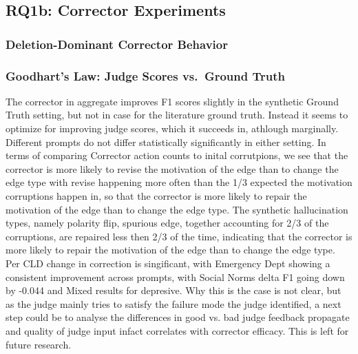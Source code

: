 \subsection{RQ1b: Corrector Experiments}
\label{sec:discussion_rq1b}

\subsubsection{Deletion-Dominant Corrector Behavior}



\subsubsection{Goodhart's Law: Judge Scores vs.\ Ground Truth}

The corrector in aggregate improves F1 scores slightly in the synthetic Ground Truth setting, but not in case for the literature ground truth. 
Instead it seems to optimize for improving judge scores, which it succeeds in, athlough marginally. 
Different prompts do not differ statistically significantly in either setting. In terms of comparing Corrector action counts to inital corrutpions, we see that the corrector is more likely to revise the motivation of the edge than to change the edge type with revise happening more often than the 1/3 expected the motivation corruptions happen in, so that the corrector is more likely to repair the motivation of the edge than to change the edge type. The synthetic hallucination types, namely polarity flip, spurious edge, together accounting for 2/3 of the corruptions, are repaired less then 2/3 of the time, indicating that the corrector is more likely to repair the motivation of the edge than to change the edge type. Per CLD change in correction is singificant, with Emergency Dept showing a consistent improvement across prompts, with Social Norms delta F1 going down by -0.044 and Mixed results for depresive. Why this is the case is not clear, but as the judge mainly tries to satisfy the failure mode the judge identified, a next step could be to analyse the differences in good vs. bad judge feedback propagate and quality of judge input infact correlates with corrector efficacy. This is left for future research. 

